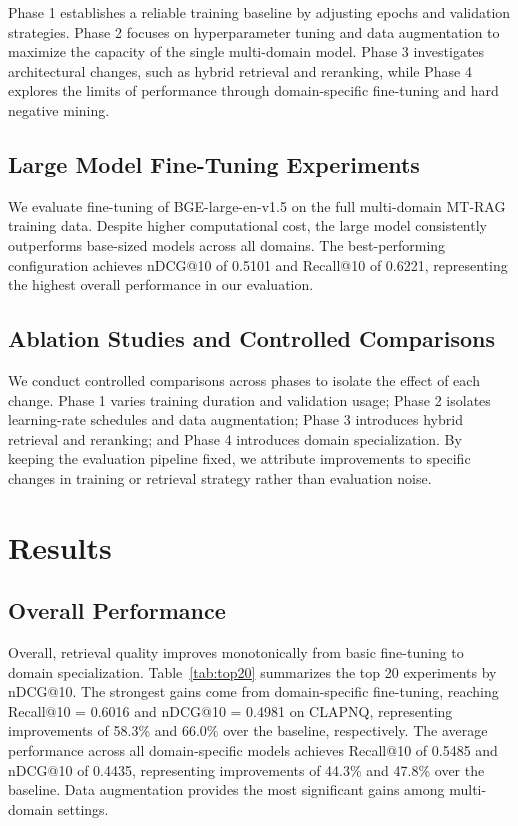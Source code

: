 \documentclass[11pt]{article}
\begin{document}
Phase 1 establishes a reliable training baseline by adjusting epochs and validation strategies. Phase 2 focuses on hyperparameter tuning and data augmentation to maximize the capacity of the single multi-domain model. Phase 3 investigates architectural changes, such as hybrid retrieval and reranking, while Phase 4 explores the limits of performance through domain-specific fine-tuning and hard negative mining.

\subsection{Large Model Fine-Tuning Experiments}
We evaluate fine-tuning of BGE-large-en-v1.5 on the full multi-domain MT-RAG training data. Despite higher computational cost, the large model consistently outperforms base-sized models across all domains. The best-performing configuration achieves nDCG@10 of 0.5101 and Recall@10 of 0.6221, representing the highest overall performance in our evaluation.

\subsection{Ablation Studies and Controlled Comparisons}
We conduct controlled comparisons across phases to isolate the effect of each change. Phase 1 varies training duration and validation usage; Phase 2 isolates learning-rate schedules and data augmentation; Phase 3 introduces hybrid retrieval and reranking; and Phase 4 introduces domain specialization. By keeping the evaluation pipeline fixed, we attribute improvements to specific changes in training or retrieval strategy rather than evaluation noise.

\section{Results}

\subsection{Overall Performance}

Overall, retrieval quality improves monotonically from basic fine-tuning to domain specialization. Table~\ref{tab:top20} summarizes the top 20 experiments by nDCG@10. The strongest gains come from domain-specific fine-tuning, reaching Recall@10 = 0.6016 and nDCG@10 = 0.4981 on CLAPNQ, representing improvements of 58.3\% and 66.0\% over the baseline, respectively. The average performance across all domain-specific models achieves Recall@10 of 0.5485 and nDCG@10 of 0.4435, representing improvements of 44.3\% and 47.8\% over the baseline. Data augmentation provides the most significant gains among multi-domain settings.
\end{document}
